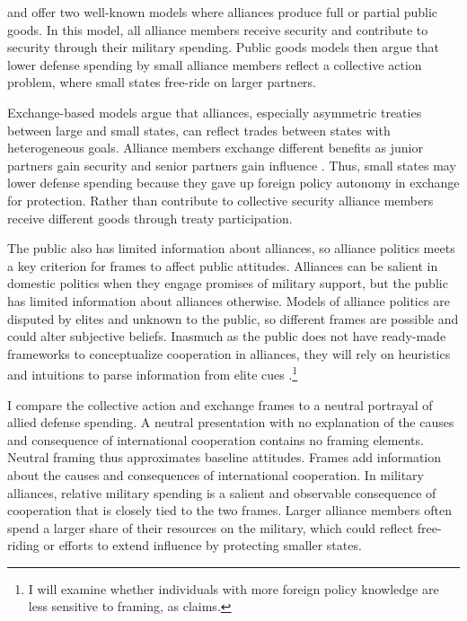 \documentclass[12pt]{article}
\begin{document}
\citet{OlsonZeckhauser1966} and \citet{SandlerHartley2001} offer two well-known models where alliances produce full or partial public goods.
In this model, all alliance members receive security and contribute to security through their military spending. 
Public goods models then argue that lower defense spending by small alliance members reflect a collective action problem, where small states free-ride on larger partners. 


Exchange-based models argue that alliances, especially asymmetric treaties between large and small states, can reflect trades between states with heterogeneous goals. 
Alliance members exchange different benefits as junior partners gain security and senior partners gain influence \citep{Morrow1991}. 
Thus, small states may lower defense spending because they gave up foreign policy autonomy in exchange for protection.
Rather than contribute to collective security alliance members receive different goods through treaty participation. 


The public also has limited information about alliances, so alliance politics meets a key criterion for frames to affect public attitudes. 
Alliances can be salient in domestic politics when they engage promises of military support, but the public has limited information about alliances otherwise. 
Models of alliance politics are disputed by elites and unknown to the public, so different frames are possible and could alter subjective beliefs.
Inasmuch as the public does not have ready-made frameworks to conceptualize cooperation in alliances, they will rely on heuristics and intuitions to parse information from elite cues \citep{BaumPotter2008}.\footnote{I will examine whether individuals with more foreign policy knowledge are less sensitive to framing, as \citet{Druckman2001} claims.} 


I compare the collective action and exchange frames to a neutral portrayal of allied defense spending. 
A neutral presentation with no explanation of the causes and consequence of international cooperation contains no framing elements. 
Neutral framing thus approximates baseline attitudes. 
Frames add information about the causes and consequences of international cooperation. 
In military alliances, relative military spending is a salient and observable consequence of cooperation that is closely tied to the two frames. 
Larger alliance members often spend a larger share of their resources on the military, which could reflect free-riding or efforts to extend influence by protecting smaller states. 
\end{document}
